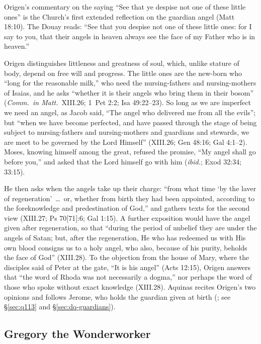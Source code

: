Origen's commentary on the saying ``See that ye despise not one of these
little ones'' is the Church's first extended reflection on the guardian
angel (Matt 18:10). The Douay reads: ``See that you despise not one of
these little ones: for I say to you, that their angels in heaven always
see the face of my Father who is in heaven.''

Origen distinguishes littleness and greatness of soul, which, unlike
stature of body, depend on free will and progress. The little ones are the
new-born who ``long for the reasonable milk,'' who need the nursing-fathers
and nursing-mothers of Isaias, and he asks ``whether it is their angels who
bring them in their bosom'' (\emph{Comm.\ in Matt.}\ XIII.26; 1~Pet 2:2;
Isa 49:22--23). So long as we are imperfect we need an angel, as Jacob
said, ``The angel who delivered me from all the evils''; but ``when we have
become perfected, and have passed through the stage of being subject to
nursing-fathers and nursing-mothers and guardians and stewards, we are meet
to be governed by the Lord Himself'' (XIII.26; Gen 48:16; Gal 4:1--2).
Moses, knowing himself among the great, refused the promise, ``My angel
shall go before you,'' and asked that the Lord himself go with him
(\emph{ibid.}; Exod 32:34; 33:15).

He then asks when the angels take up their charge: ``from what time `by
the laver of regeneration'~\dots\ or, whether from birth they had been
appointed, according to the foreknowledge and predestination of God,''
and gathers texts for the second view (XIII.27; Ps 70[71]:6; Gal 1:15). A
further exposition would have the angel given after regeneration, so that
``during the period of unbelief they are under the angels of Satan; but,
after the regeneration, He who has redeemed us with His own blood consigns
us to a holy angel, who also, because of his purity, beholds the face of
God'' (XIII.28). To the objection from the house of Mary, where the
disciples said of Peter at the gate, ``It is his angel'' (Acts 12:15), Origen answers that ``the word of Rhoda was not necessarily a dogma,'' nor
perhaps the word of those who spoke without exact knowledge (XIII.28). Aquinas recites Origen's two opinions and follows Jerome, who
holds the guardian given at birth (; see \S\ref{sec:q113}
and \S\ref{sec:dq-guardians}).

\sectionguard
\subsection{Gregory the Wonderworker}

